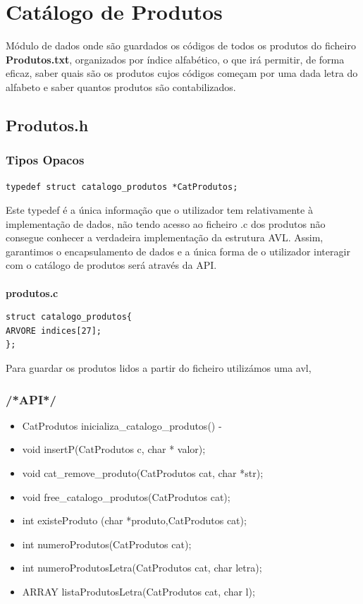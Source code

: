 \section{Catálogo de Produtos}

 Módulo de dados onde são guardados os códigos de todos os produtos do ficheiro \textbf{Produtos.txt}, organizados por índice alfabético, o que irá permitir, de forma eficaz, saber quais são os produtos cujos códigos começam por uma dada letra do alfabeto e saber quantos produtos são contabilizados. 


\subsection{Produtos.h}

\subsubsection{Tipos Opacos}
\begin{verbatim}
typedef struct catalogo_produtos *CatProdutos;
\end{verbatim}

Este typedef é a única informação que o utilizador tem relativamente à implementação de dados, não tendo acesso ao ficheiro .c dos produtos não consegue conhecer a verdadeira implementação da estrutura AVL. Assim, garantimos o encapsulamento de dados e a única forma de o utilizador interagir com o catálogo de produtos será através da API. 

\paragraph{}
\textbf{produtos.c}

\begin{verbatim}
struct catalogo_produtos{
ARVORE indices[27];
};
\end{verbatim}

 Para guardar os produtos lidos a partir do ficheiro utilizámos uma avl,

\subsubsection{/*API*/}

\begin{itemize}
	
\item CatProdutos inicializa\_catalogo\_produtos() - 
\item void insertP(CatProdutos c, char * valor);
\item void cat\_remove\_produto(CatProdutos cat, char *str);
\item void free\_catalogo\_produtos(CatProdutos cat);
\item int existeProduto (char *produto,CatProdutos cat);
\item int numeroProdutos(CatProdutos cat);
\item int numeroProdutosLetra(CatProdutos cat, char letra);
\item ARRAY listaProdutosLetra(CatProdutos cat, char l);
\end{itemize}


